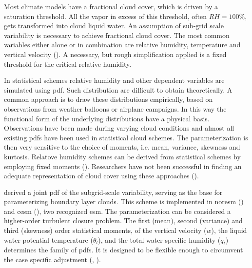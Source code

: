 Most climate models have a fractional cloud cover, which is driven by a saturation threshold. All the vapor in excess of this threshold, often $RH=100\%$, gets transformed into cloud liquid water. An assumption of sub-grid scale variability is necessary to achieve fractional cloud cover. %
The most common variables either alone or in combination are relative humidity, temperature and vertical velocity (\cite{Golaz2002_part1}). A necessary, but rough simplification applied is a fixed threshold for the critical relative humidity. 

In statistical schemes relative humidity and other dependent variables are simulated using \acrfull{pdf}. Such distribution are difficult to obtain theoretically. A common approach is to draw these distributions empirically, based on observations from weather balloons or airplane campaigns. In this way the functional form of the underlying distributions have a physical basis. Observations have been made during varying cloud conditions and almost all existing \acrshort{pdf}s have been used in statistical cloud schemes. The parameterization is then very sensitive to the choice of moments, i.e. mean, variance, skewness and kurtosis. Relatove humidity schemes can be derived from statistical schemes by employing fixed moments (\cite{Tomkins2005}). Researchers have not been successful in finding an adequate representation of cloud cover using these approaches (\cite{Tompkins2009CloudParametrization}). 

 derived a joint \acrshort{pdf} of the subgrid-scale variability, serving as the base for parameterizing boundary layer clouds. This scheme is implemented in \acrfull{noresm} (\cite{SelandNORESM}) and \acrfull{cesm} (\cite{DanabasogluCESM}), two recognized \acrshort{esm}. The parameterization can be considered a higher-order turbulent closure problem. The first (mean), second (variance) and third (skewness) order statistical moments, of the vertical velocity ($w$), the liquid water potential temperature ($\theta_l$), and the total water specific humidity ($q_t$) determines the family of \acrshort{pdf}s. It is designed to be flexible enough to 
circumvent the case specific adjustment (\cite{Golaz2002_part1}, \cite{Golaz2002_part2}). 

